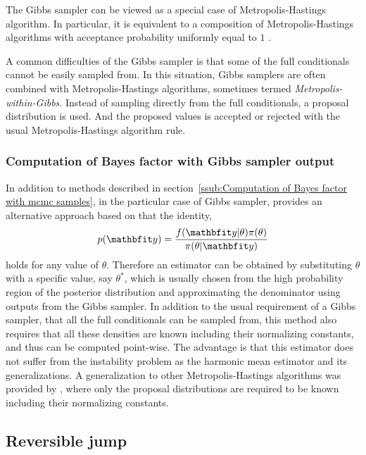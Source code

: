 The Gibbs sampler can be viewed as a special case of Metropolis-Hastings
algorithm. In particular, it is equivalent to a composition of
Metropolis-Hastings algorithms with acceptance probability uniformly equal to
$1$ \cite[][Theorem~10.13]{Robert:2004tn}.

A common difficulties of the Gibbs sampler is that some of the full
conditionals cannot be easily sampled from. In this situation, Gibbs samplers
are often combined with Metropolis-Hastings algorithms, sometimes termed
\emph{Metropolis-within-Gibbs}. Instead of sampling directly from the full
conditionals, a proposal distribution is used. And the proposed values is
accepted or rejected with the usual Metropolis-Hastings algorithm rule.

\subsubsection{Computation of Bayes factor with Gibbs sampler output}
\label{ssub:Computation of Bayes factor with Gibbs sampler output}

In addition to methods described in section~\ref{ssub:Computation of Bayes
  factor with mcmc samples}, in the particular case of Gibbs sampler,
\cite{Chib:1995em} provides an alternative approach based on that the
identity,
\begin{equation}
  p(\data) = \frac{f(\data|\theta)\pi(\theta)}{\pi(\theta|\data)}
\end{equation}
holds for any value of $\theta$. Therefore an estimator can be obtained by
substituting $\theta$ with a specific value, say $\theta^*$, which is usually
chosen from the high probability region of the posterior distribution and
approximating the denominator using outputs from the Gibbs sampler. In
addition to the usual requirement of a Gibbs sampler, that all the full
conditionals can be sampled from, this method also requires that all these
densities are known including their normalizing constants, and thus can be
computed point-wise. The advantage is that this estimator does not suffer from
the instability problem as the harmonic mean estimator and its
generalizations. A generalization to other Metropolis-Hastings algorithms was
provided by \cite{Chib:2001gq}, where only the proposal distributions are
required to be known including their normalizing constants.

\subsection{Reversible jump \protect\mcmc}
\label{sub:Reversible jump mcmc}

